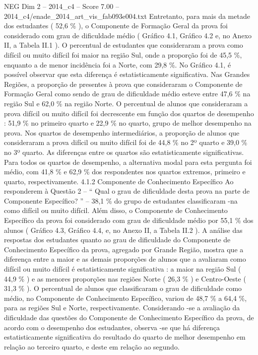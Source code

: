 \begin{textsample}{NEG Dim 2 – 2014\_c4 – Score 7.00 – 2014\_c4/enade\_2014\_art\_vis\_fab093e004.txt}
Entretanto, para mais da metade dos estudantes ( 52,6 \% ), o Componente de Formação Geral da prova foi considerado com grau de dificuldade médio ( Gráfico 4.1, Gráfico 4.2 e, no Anexo II, a Tabela II.1 ).
O percentual de estudantes que consideraram a prova como difícil ou muito difícil foi maior na região Sul, onde a proporção foi de 45,5 \%, enquanto a de menor incidência foi a Norte, com 29,8 \%.
No Gráfico 4.1, é possível observar que esta diferença é estatisticamente significativa.
Nas Grandes Regiões, a proporção de presentes à prova que consideraram o Componente de Formação Geral como sendo de grau de dificuldade médio esteve entre 47,6 \% na região Sul e 62,0 \% na região Norte.
O percentual de alunos que consideraram a prova difícil ou muito difícil foi decrescente em função dos quartos de desempenho : 51,9 \% no primeiro quarto e 22,9 \% no quarto, grupo de melhor desempenho na prova.
Nos quartos de desempenho intermediários, a proporção de alunos que consideraram a prova difícil ou muito difícil foi de 44,8 \% no 2º quarto e 39,0 \% no 3º quarto.
As diferenças entre os quartos são estatisticamente significativas.
Para todos os quartos de desempenho, a alternativa modal para esta pergunta foi médio, com 41,8 \% e 62,9 \% dos respondentes nos quartos extremos, primeiro e quarto, respectivamente. 4.1.2 Componente de Conhecimento Específico Ao responderem à Questão 2 – “ Qual o grau de dificuldade desta prova na parte de Componente Específico? ” – 38,1 \% do grupo de estudantes classificaram -na como difícil ou muito difícil.
Além disso, o Componente de Conhecimento Específico da prova foi considerado com grau de dificuldade médio por 55,1 \% dos alunos ( Gráfico 4.3, Gráfico 4.4, e, no Anexo II, a Tabela II.2 ).
A análise das respostas dos estudantes quanto ao grau de dificuldade do Componente de Conhecimento Específico da prova, agregado por Grande Região, mostra que a diferença entre a maior e as demais proporções de alunos que a avaliaram como difícil ou muito difícil é estatisticamente significativa : a maior na região Sul ( 44,9 \% ) e as menores proporções nas regiões Norte ( 26,3 \% ) e Centro-Oeste ( 31,3 \% ).
O percentual de alunos que classificaram o grau de dificuldade como médio, no Componente de Conhecimento Específico, variou de 48,7 \% a 64,4 \%, para as regiões Sul e Norte, respectivamente.
Considerando -se a avaliação da dificuldade das questões do Componente de Conhecimento Específico da prova, de acordo com o desempenho dos estudantes, observa -se que há diferença estatisticamente significativa do resultado do quarto de melhor desempenho em relação ao terceiro quarto, e deste em relação ao segundo.

\end{textsample}
